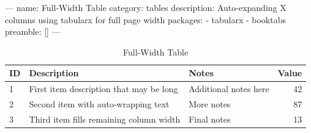 ---
name: Full-Width Table
category: tables
description: Auto-expanding X columns using tabularx for full page width
packages:
  - tabularx
  - booktabs
preamble: []
---
\begin{table}[htbp]
\centering
\caption{Full-Width Table}
\begin{tabularx}{\textwidth}{l X X r}
  \toprule
  ID & Description & Notes & Value \\
  \midrule
  1  & First item description that may be long  & Additional notes here & 42 \\
  2  & Second item with auto-wrapping text      & More notes            & 87 \\
  3  & Third item fills remaining column width  & Final notes           & 13 \\
  \bottomrule
\end{tabularx}
\end{table}
